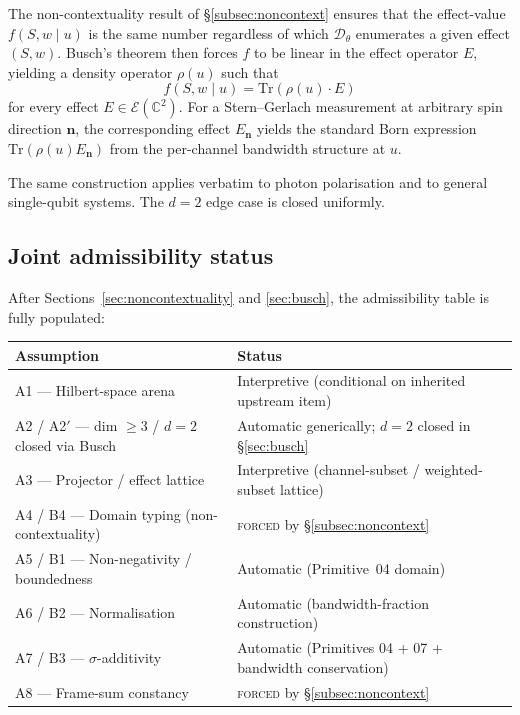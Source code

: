 \documentclass[11pt,a4paper]{article}
\begin{document}
The non-contextuality result of \S\ref{subsec:noncontext} ensures that the effect-value $f(S, w \mid u)$ is the same number regardless of which $\mathcal{D}_\theta$ enumerates a given effect $(S, w)$. Busch's theorem then forces $f$ to be linear in the effect operator $E$, yielding a density operator $\rho(u)$ such that
\begin{equation}
f(S, w \mid u) = \mathrm{Tr}(\rho(u) \cdot E)
\label{eq:bornd2}
\end{equation}
for every effect $E \in \mathcal{E}(\mathbb{C}^2)$. For a Stern--Gerlach measurement at arbitrary spin direction $\mathbf{n}$, the corresponding effect $E_\mathbf{n}$ yields the standard Born expression $\mathrm{Tr}(\rho(u) E_\mathbf{n})$ from the per-channel bandwidth structure at $u$.

The same construction applies verbatim to photon polarisation and to general single-qubit systems. The $d = 2$ edge case is closed uniformly.

\subsection{Joint admissibility status}

After Sections~\ref{sec:noncontextuality} and \ref{sec:busch}, the admissibility table is fully populated:
\begin{center}
\begin{tabular}{ll}
\hline
Assumption & Status \\
\hline
A1 --- Hilbert-space arena & Interpretive (conditional on inherited upstream item) \\
A2 / A2$'$ --- dim $\geq 3$ / $d = 2$ closed via Busch & Automatic generically; $d = 2$ closed in \S\ref{sec:busch} \\
A3 --- Projector / effect lattice & Interpretive (channel-subset / weighted-subset lattice) \\
A4 / B4 --- Domain typing (non-contextuality) & \textsc{forced} by \S\ref{subsec:noncontext} \\
A5 / B1 --- Non-negativity / boundedness & Automatic (Primitive~04 domain) \\
A6 / B2 --- Normalisation & Automatic (bandwidth-fraction construction) \\
A7 / B3 --- $\sigma$-additivity & Automatic (Primitives 04 + 07 + bandwidth conservation) \\
A8 --- Frame-sum constancy & \textsc{forced} by \S\ref{subsec:noncontext} \\
\hline
\end{tabular}
\end{center}
\end{document}
